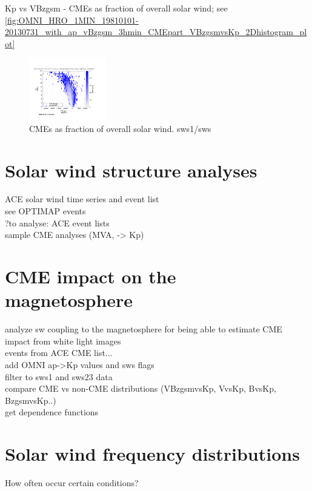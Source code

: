 Kp vs VBzgsm - CMEs as fraction of overall solar wind; see \autoref{fig:OMNI_HRO_1MIN_19810101-20130731_with_ap_vBzgsm_3hmin_CMEpart_VBzgsmvsKp_2Dhistogram_plot}
\begin{figure}[htb]
	\centering
	\includegraphics[width=0.3\textwidth]{images/gnuplots/OMNI_HRO_1MIN_19810101-20130731_with_ap_vBzgsm_3hmin_CMEpart_VBzgsmvsKp_2Dhistogram_plot.png}
	\caption{CMEs as fraction of overall solar wind. sws1/sws}
	\label{fig:OMNI_HRO_1MIN_19810101-20130731_with_ap_vBzgsm_3hmin_CMEpart_VBzgsmvsKp_2Dhistogram_plot}
\end{figure}


\section{Solar wind structure analyses}
ACE solar wind time series and event list\\

see OPTIMAP events\\
?to analyse: ACE event lists\\

sample CME analyses (MVA, -> Kp)\\


\section{CME impact on the magnetosphere}
analyze sw coupling to the magnetosphere for being able to estimate CME impact from white light images\\

events from ACE CME list...\\

add OMNI ap->Kp values and sws flags\\
filter to sws1 and sws23 data\\
compare CME vs non-CME distributions (VBzgsmvsKp, VvsKp, BvsKp, BzgsmvsKp..)\\
get dependence functions\\


\section{Solar wind frequency distributions}
How often occur certain conditions?\\

